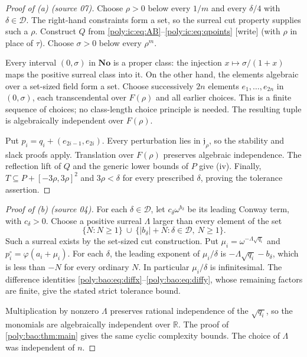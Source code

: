 \documentclass[11pt,a4paper]{article}
\numberwithin{equation}{section}
\theoremstyle{plain}
\newcommand{\wtag}{\textup{[write]}}%
\newcommand{\No}{\mathbf{No}}
\newcommand{\R}{\mathbb R}
\newcommand{\ph}{\varphi}
\newcommand{\JJ}{\mathfrak j}
\newcommand{\boxrad}[1]{[-#1,#1]^2}
\begin{document}
\begin{proof}[Proof of (a) (source 07)]
Choose $\rho>0$ below every $1/m$ and every $\delta/4$ with
$\delta\in\mathcal D$. The right-hand constraints form a set, so the
surreal cut property supplies such a $\rho$. Construct $Q$ from
\eqref{poly:ic:eq:AB}--\eqref{poly:ic:eq:qpoints}
\wtag{} (with $\rho$ in place of $\tau$). Choose $\sigma>0$ below every $\rho^m$.

Every interval $(0,\sigma)$ in $\No$ is a proper class: the injection
$x\mapsto\sigma/(1+x)$ maps the positive surreal class into it. On the
other hand, the elements algebraic over a set-sized field form a set.
Choose successively $2n$ elements $e_1,\ldots,e_{2n}$ in $(0,\sigma)$,
each transcendental over $F(\rho)$ and all earlier choices. This is a
finite sequence of choices; no class-length choice principle is needed.
The resulting tuple is algebraically independent over $F(\rho)$.

Put $p_i=q_i+(e_{2i-1},e_{2i})$. Every perturbation lies in
$\JJ_\rho$, so the stability and slack proofs apply. Translation over
$F(\rho)$ preserves algebraic independence. The reflection lift of $Q$
and the generic lower bounds of $P$ give (iv). Finally,
$T\subseteq P+\boxrad{3\rho}$ and $3\rho<\delta$ for every prescribed
$\delta$, proving the tolerance assertion.
\end{proof}
\begin{proof}[Proof of (b) (source 04)]
For each $\delta\in\mathcal D$, let $c_\delta\omega^{b_\delta}$ be its leading
Conway term, with $c_\delta>0$. Choose a positive surreal $\Lambda$ larger
than every element of the set
\[
 \{N:N\geq1\}\ \cup\
 \{|b_\delta|+N:\delta\in\mathcal D,\ N\geq1\}.
\]
Such a surreal exists by the set-sized cut construction. Put
$\mu_i=\omega^{-\Lambda\sqrt{q_i}}$ and $p^\circ_i=\ph(a_i+\mu_i)$.
For each $\delta$, the leading exponent of $\mu_i/\delta$ is
$-\Lambda\sqrt{q_i}-b_\delta$, which is less than $-N$ for every ordinary
$N$. In particular $\mu_i/\delta$ is infinitesimal. The difference identities
\eqref{poly:bao:eq:diffx}--\eqref{poly:bao:eq:diffy}, whose remaining factors are finite, give the
stated strict tolerance bound.

Multiplication by nonzero $\Lambda$ preserves rational independence of
the $\sqrt{q_i}$, so the monomials are algebraically independent over
$\R$. The proof of \cref{poly:bao:thm:main} gives the same cyclic complexity
bounds. The choice of $\Lambda$ was independent of $n$.
\end{proof}
\end{document}

